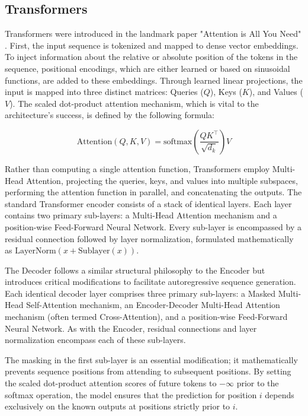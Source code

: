 \documentclass[en,ack]{dimscthesis}
\begin{document}
\subsection{Transformers}
\par Transformers were introduced in the landmark paper "Attention is All You Need" \parencite{vaswaniAttentionAllYou2023}. First, the input sequence is tokenized and mapped to dense vector embeddings. To inject information about the relative or absolute position of the tokens in the sequence, positional encodings, which are either learned or based on sinusoidal functions, are added to these embeddings. Through learned linear projections, the input is mapped into three distinct matrices: Queries ($Q$), Keys ($K$), and Values ($V$). The scaled dot-product attention mechanism, which is vital to the architecture's success, is defined by the following formula:

\begin{equation}
	\text{Attention}(Q, K, V) = \text{softmax}\left( \frac{QK^\top}{\sqrt{d_k}} \right) V
\end{equation}
\newpage

\par Rather than computing a single attention function, Transformers employ Multi-Head Attention, projecting the queries, keys, and values into multiple subspaces, performing the attention function in parallel, and concatenating the outputs. The standard Transformer encoder consists of a stack of identical layers. Each layer contains two primary sub-layers: a Multi-Head Attention mechanism and a position-wise Feed-Forward Neural Network. Every sub-layer is encompassed by a residual connection followed by layer normalization, formulated mathematically as $\text{LayerNorm}(x + \text{Sublayer}(x))$.

The Decoder follows a similar structural philosophy to the Encoder but introduces critical modifications to facilitate autoregressive sequence generation. Each identical decoder layer comprises three primary sub-layers: a Masked Multi-Head Self-Attention mechanism, an Encoder-Decoder Multi-Head Attention mechanism (often termed Cross-Attention), and a position-wise Feed-Forward Neural Network. As with the Encoder, residual connections and layer normalization encompass each of these sub-layers.

The masking in the first sub-layer is an essential modification; it mathematically prevents sequence positions from attending to subsequent positions. By setting the scaled dot-product attention scores of future tokens to $-\infty$ prior to the softmax operation, the model ensures that the prediction for position $i$ depends exclusively on the known outputs at positions strictly prior to $i$. 
\end{document}
